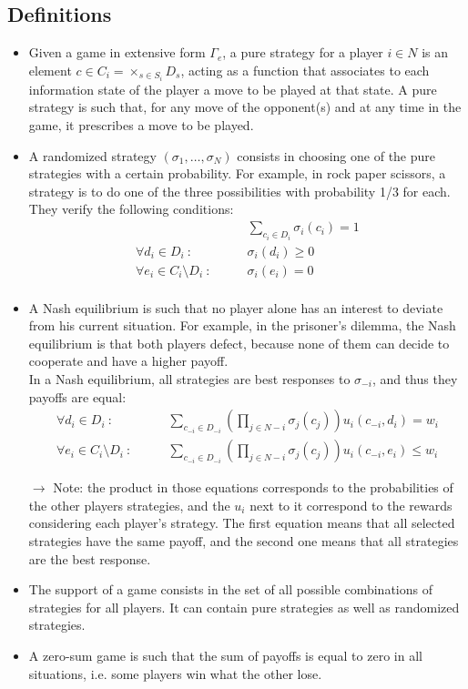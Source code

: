 \documentclass[12pt, openany]{report}
\theoremstyle{definition}
\begin{document}
\subsection{Definitions}
\begin{itemize}
	\item Given a game in extensive form $\Gamma_e$, a pure strategy for a player $i\in N$ is an element $c\in C_i = \times_{s\in S_i}D_s$, acting as a function that associates to each information state of the player a move to be played at that state. A pure strategy is such that, for any move of the opponent(s) and at any time in the game, it prescribes a move to be played.
	\item A randomized strategy $(\sigma_1,\dots, \sigma_N)$ consists in choosing one of the pure strategies with a certain probability. For example, in rock paper scissors, a strategy is to do one of the three possibilities with probability 1/3 for each.\\
	They verify the following conditions:
	\begin{equation}
		\begin{aligned}
			&\sum_{c_i\in D_i}\sigma_i(c_i)=1\\
			\forall d_i\in D_i\ :\qquad &\sigma_i(d_i)\ge 0\\
			\forall e_i\in C_i\setminus D_i\ : \qquad &\sigma_i(e_i)=0\\
		\end{aligned}
	\end{equation}
	\item A Nash equilibrium is such that no player alone has an interest to deviate from his current situation. For example, in the prisoner's dilemma, the Nash equilibrium is that both players defect, because none of them can decide to cooperate and have a higher payoff.\\
	In a Nash equilibrium, all strategies are best responses to $\sigma_{-i}$, and thus they payoffs are equal:
	\begin{equation}
		\begin{aligned}
			\forall d_i\in D_i\ : \qquad &\sum_{c_{-i}\in D_{-i}} \left(\prod_{j\in N-i}\sigma_j(c_j)\right) u_i(c_{-i},d_i)=w_i\\
			\forall e_i\in C_i\setminus D_i\ : \qquad &\sum_{c_{-i}\in D_{-i}} \left(\prod_{j\in N-i}\sigma_j(c_j)\right) u_i(c_{-i},e_i)\le w_i
		\end{aligned}
	\end{equation}
	\item [$\to$] Note: the product in those equations corresponds to the probabilities of the other players strategies, and the $u_i$ next to it correspond to the rewards considering each player's strategy. The first equation means that all selected strategies have the same payoff, and the second one means that all strategies are the best response. 
	\item The support of a game consists in the set of all possible combinations of strategies for all players. It can contain pure strategies as well as randomized strategies. 
	\item A zero-sum game is such that the sum of payoffs is equal to zero in all situations, i.e. some players win what the other lose.
\end{itemize}
\end{document}
